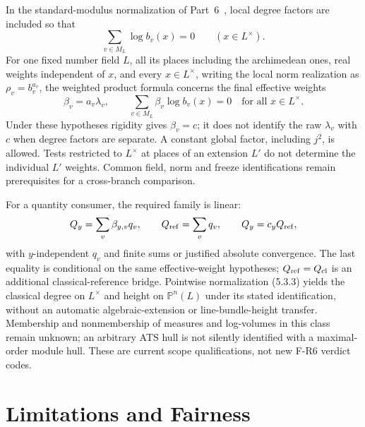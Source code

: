 \documentclass[11pt,a4paper]{article}
\begin{document}
In the standard-modulus normalization of Part~6~\cite{part6current}, local
degree factors are included so that
\[
 \sum_{v\in M_L}\log b_v(x)=0\qquad(x\in L^\times).
\]
For one fixed number field $L$, all its places including the archimedean
ones, real weights independent of $x$, and every $x\in L^\times$,
writing the local norm realization as $\rho_v=b_v^{a_v}$, the
weighted product formula concerns the final effective weights
\[
 \beta_v=a_v\lambda_v,\qquad
 \sum_{v\in M_L}\beta_v\log b_v(x)=0\quad\text{for all }x\in L^\times.
\]
Under these hypotheses rigidity gives $\beta_v=c$; it does not identify
the raw $\lambda_v$ with $c$ when degree factors are separate. A constant
global factor, including $j^2$, is allowed. Tests restricted to $L^\times$
at places of an extension $L'$ do not determine the individual $L'$ weights.
Common field, norm and freeze identifications remain prerequisites for a
cross-branch comparison.

For a quantity consumer, the required family is linear:
\[
 Q_y=\sum_v\beta_{y,v}q_v,\qquad Q_{\rm ref}=\sum_v q_v,
 \qquad Q_y=c_yQ_{\rm ref},
\]
with $y$-independent $q_v$ and finite sums or justified absolute convergence.
The last equality is conditional on the same effective-weight hypotheses;
$Q_{\rm ref}=Q_{\rm cl}$ is an additional classical-reference bridge.
Pointwise normalization (5.3.3) yields the classical degree on $L^\times$
and height on $\mathbb P^n(L)$ under its stated identification, without an
automatic algebraic-extension or line-bundle-height transfer. Membership
and nonmembership of measures and log-volumes in this class remain unknown;
an arbitrary ATS hull is not silently identified with a maximal-order module
hull. These are current scope qualifications, not new F-R6 verdict codes.

\section{Limitations and Fairness}\label{sec:limits}
\end{document}
